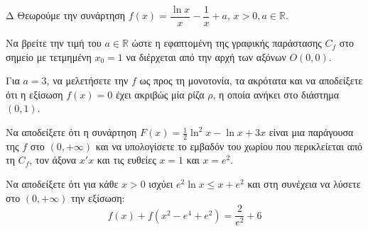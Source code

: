 \begin{thema}{Δ}
Θεωρούμε την συνάρτηση $f(x) = \dfrac{\ln x}{x} - \dfrac{1}{x} + a$, $x>0, a \in \mathbb{R}$.
\begin{erwthma}
    \item Να βρείτε την τιμή του $a \in \mathbb{R}$ ώστε η εφαπτομένη της γραφικής παράστασης $C_f$ στο σημείο με τετμημένη $x_0 = 1$ να διέρχεται από την αρχή των αξόνων $O(0,0)$.
    \item Για $a=3$, να μελετήσετε την $f$ ως προς τη μονοτονία, τα ακρότατα και να αποδείξετε ότι η εξίσωση $f(x) = 0$ έχει ακριβώς μία ρίζα $\rho$, η οποία ανήκει στο διάστημα $(0, 1)$.
    \item Να αποδείξετε ότι η συνάρτηση $\displaystyle F(x) = \frac{1}{2}\ln^2 x - \ln x + 3x$ είναι μια παράγουσα της $f$ στο $(0, +\infty)$ και να υπολογίσετε το εμβαδόν του χωρίου που περικλείεται από τη $C_f$, τον άξονα $x'x$ και τις ευθείες $x=1$ και $x=e^2$.
\item Να αποδείξετε ότι για κάθε $x > 0$ ισχύει $e^2 \ln x \le x + e^2$ και στη συνέχεια να λύσετε στο $(0, +\infty)$ την εξίσωση:
    \[ f(x) + f(x^2 - e^4 + e^2) = \frac{2}{e^2} + 6 \]
\end{erwthma}
\end{thema}
